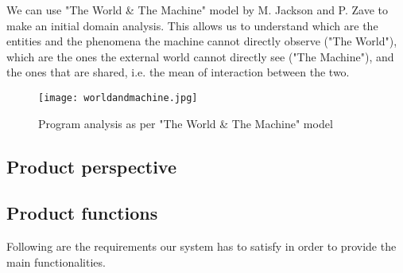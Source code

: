 \documentclass[../main.tex]{subfiles}
\begin{document}
We can use "The World \& The Machine" model by M. Jackson and P. Zave to make an initial domain analysis. This allows us to understand which are the entities and the phenomena the machine cannot directly observe ("The World"), which are the ones the external world cannot directly see ("The Machine"), and the ones that are shared, i.e. the mean of interaction between the two.

\begin{figure}[h!]
  \texttt{[image: worldandmachine.jpg]}
  \caption{Program analysis as per "The World \& The Machine" model}
  \label{fig:worldandmachine}
\end{figure}

\subsection{Product perspective}

\subsection{Product functions}

\vspace{8mm}

Following are the requirements our system has to satisfy in order to provide the main functionalities.

\vspace{8mm}
\end{document}
